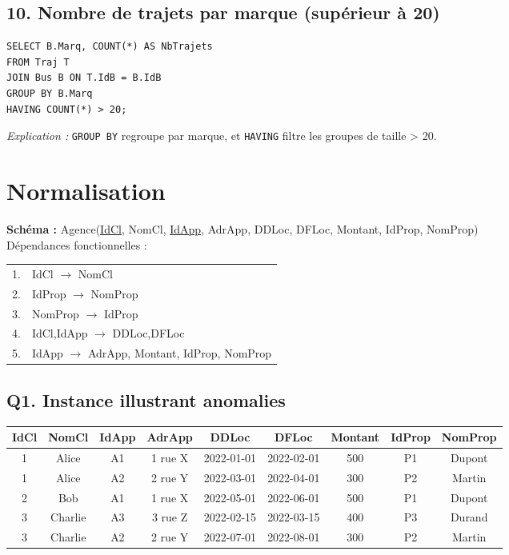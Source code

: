 \documentclass[a4paper,11pt]{article}
\begin{document}
\subsection*{10. Nombre de trajets par marque (supérieur à 20)}
\begin{verbatim}
SELECT B.Marq, COUNT(*) AS NbTrajets
FROM Traj T
JOIN Bus B ON T.IdB = B.IdB
GROUP BY B.Marq
HAVING COUNT(*) > 20;
\end{verbatim}
\textit{Explication :} \texttt{GROUP BY} regroupe par marque, et \texttt{HAVING} filtre les groupes de taille > 20.

\section*{Normalisation}
\textbf{Schéma :}\newline
Agence(\underline{IdCl}, NomCl, \underline{IdApp}, AdrApp, DDLoc, DFLoc, Montant, IdProp, NomProp)\\
Dépendances fonctionnelles :\\
\begin{tabular}{ll}
1. & IdCl $\to$ NomCl \\
2. & IdProp $\to$ NomProp \\
3. & NomProp $\to$ IdProp \\
4. & IdCl,IdApp $\to$ DDLoc,DFLoc \\
5. & IdApp $\to$ AdrApp, Montant, IdProp, NomProp
\end{tabular}

\subsection*{Q1. Instance illustrant anomalies}
\begin{center}
\begin{tabular}{|c|c|c|c|c|c|c|c|c|}
\hline
IdCl & NomCl & IdApp & AdrApp & DDLoc & DFLoc & Montant & IdProp & NomProp \\
\hline
1 & Alice   & A1 & 1 rue X & 2022-01-01 & 2022-02-01 & 500 & P1 & Dupont \\
1 & Alice   & A2 & 2 rue Y & 2022-03-01 & 2022-04-01 & 300 & P2 & Martin \\
2 & Bob     & A1 & 1 rue X & 2022-05-01 & 2022-06-01 & 500 & P1 & Dupont \\
3 & Charlie & A3 & 3 rue Z & 2022-02-15 & 2022-03-15 & 400 & P3 & Durand \\
3 & Charlie & A2 & 2 rue Y & 2022-07-01 & 2022-08-01 & 300 & P2 & Martin \\
\hline
\end{tabular}
\end{center}
\end{document}
